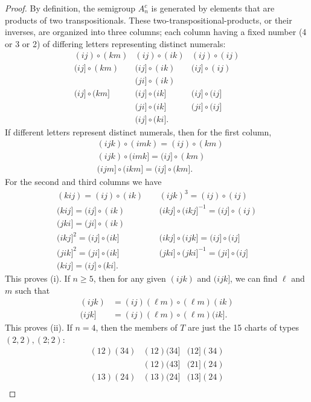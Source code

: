\documentclass{surv-l}
\numberwithin{equation}{section}
\numberwithin{table}{section}
\numberwithin{figure}{section}
\theoremstyle{plain}
\theoremstyle{definition}
\begin{document}
\begin{proof} By definition, the semigroup $A_{n}^{c}$ is generated by
elements that are products of two transpositionals. These
two-transpositional-products, or their inverses, are organized
into three columns; each column having a fixed number (4 or 3 or
2) of differing letters representing distinct numerals:
\[
\begin{matrix}
(ij)\circ(km) &(ij)\circ (ik) &(ij)\circ(ij) \\
(ij]\circ(km) &(ij]\circ (ik) &(ij]\circ (ij) \\
&(ji]\circ(ik) & \\
(ij]\circ (km] &(ij]\circ(ik] &(ij]\circ (ij] \\
&(ji]\circ(ik] &(ji]\circ(ij] \\
&(ij]\circ(ki].&
\end{matrix}
\]
If different letters represent distinct numerals, then for the
first column,
\begin{align*}
&(ijk)\circ (imk)=(ij)\circ (km) \\
&(ijk)\circ (imk]=(ij] \circ (km) \\
&(ijm]\circ(ikm]=(ij]\circ (km].
\end{align*}
For the second and third columns we have
\[
\begin{array}{rlr}
(kij)=(ij)\circ(ik)\phantom{.} &&(ijk)^{3}=(ij)\circ(ij) \\
(kij]=(ij]\circ(ik)\phantom{.} &&(ikj]\circ (ikj]^{-1}=(ij]\circ(ij) \\
(jki]=(ji]\circ(ik)\phantom{.} &&  \\
(ikj]^{2}=(ij]\circ(ik]\phantom{.} &&(ikj]\circ (ijk]=(ij]\circ(ij] \\
(jik]^{2}=(ji]\circ (ik]\phantom{.} &&(jki]\circ(jki]^{-1}=(ji]\circ (ij] \\
(kij]=(ij]\circ(ki]. &&
\end{array}
\]
This proves (i). If $n \geq 5$, then for any given $(ijk)$ and
$(ijk]$, we can find $\ell$ and $m$ such that
\begin{align*}
(ijk)&=(ij)(\ell m)\circ (\ell m)(ik) \\
(ijk] &=(ij)(\ell m)\circ (\ell m)(ik].
\end{align*}
This proves (ii). If $n =4$, then the members of $T$ are just the
15 charts of types $(2,2),(2;2)$:
\[
\begin{matrix}
(12)(34) &(12)(34] &(12](34) \\
&(12)(43] &(21](24)\\
(13)(24) &(13)(24] &(13](24) \\

\end{matrix}\]
\end{proof}
\end{document}
